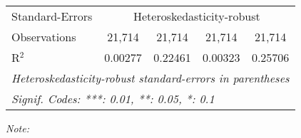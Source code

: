 \begin{table}[htbp!]
\begin{adjustbox}{width = 1\textwidth, max height = 0.95\textheight, center}
\begin{threeparttable}[b]
\begin{tabular}{lcccc}
            Standard-Errors & \multicolumn{4}{c}{Heteroskedasticity-robust} \\ 
            Observations         & 21,714                   & 21,714                         & 21,714                         & 21,714\\  
            R$^2$                & 0.00277                  & 0.22461                        & 0.00323                        & 0.25706\\  
            \midrule \midrule
            \multicolumn{5}{l}{\emph{Heteroskedasticity-robust standard-errors in parentheses}}\\
            \multicolumn{5}{l}{\emph{Signif. Codes: ***: 0.01, **: 0.05, *: 0.1}}\\
         \end{tabular}
         
         \begin{tablenotes}\item \medskip \textit{Note:}
         \end{tablenotes}
      \end{threeparttable}
   \end{adjustbox}
\end{table}


